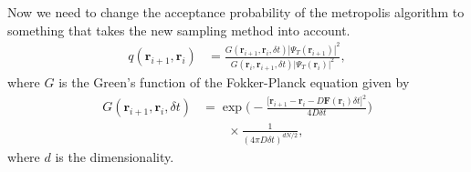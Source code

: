 \documentclass[
    a4paper, aps, twocolumn, floatfix, superscriptaddress, nofootinbib]{revtex4-1}
\newcommand{\vf}{\mathbf}
\newcommand{\1}{\mathds{1}}
\begin{document}
            Now we need to change the acceptance probability of the metropolis
            algorithm to something that takes the new sampling method into
            account.
            \begin{align}
                q(\vf{r}_{i + 1}, \vf{r}_i)
                &=
                \frac{
                    G(\vf{r}_{i + 1}, \vf{r}_{i}, \delta t)
                    \left|\Psi_T(\vf{r}_{i + 1})\right|^2
                }
                {
                    G(\vf{r}_{i}, \vf{r}_{i + 1}, \delta t)
                    \left|\Psi_T(\vf{r}_{i})\right|^2
                },
            \end{align}
            where $G$ is the Green's function of the Fokker-Planck equation
            given by
            \begin{align}
                G(\vf{r}_{i + 1}, \vf{r}_i, \delta t)
                &=
                \exp\Biggl(
                    -\frac{\bigl[
                        \vf{r}_{i + 1}
                        - \vf{r}_{i}
                        - D\vf{F}(\vf{r}_i)\delta t
                    \bigr]^2}{4D\delta t}
                \Biggr)
                \nonumber \\
                &\qquad
                \times
                \frac{1}{(4\pi D\delta t)^{dN/2}},
            \end{align}
            where $d$ is the dimensionality.
\end{document}
